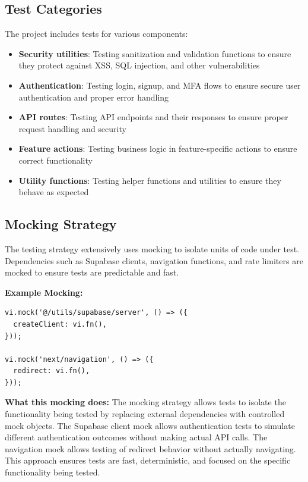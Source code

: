 \subsection{Test Categories}

The project includes tests for various components:

\begin{itemize}
    \item \textbf{Security utilities}: Testing sanitization and validation functions to ensure they protect against XSS, SQL injection, and other vulnerabilities
    \item \textbf{Authentication}: Testing login, signup, and MFA flows to ensure secure user authentication and proper error handling
    \item \textbf{API routes}: Testing API endpoints and their responses to ensure proper request handling and security
    \item \textbf{Feature actions}: Testing business logic in feature-specific actions to ensure correct functionality
    \item \textbf{Utility functions}: Testing helper functions and utilities to ensure they behave as expected
\end{itemize}

\subsection{Mocking Strategy}

The testing strategy extensively uses mocking to isolate units of code under test. Dependencies such as Supabase clients, navigation functions, and rate limiters are mocked to ensure tests are predictable and fast.

\textbf{Example Mocking:}
\begin{verbatim}
vi.mock('@/utils/supabase/server', () => ({
  createClient: vi.fn(),
}));

vi.mock('next/navigation', () => ({
  redirect: vi.fn(),
}));
\end{verbatim}

\textbf{What this mocking does:} The mocking strategy allows tests to isolate the functionality being tested by replacing external dependencies with controlled mock objects. The Supabase client mock allows authentication tests to simulate different authentication outcomes without making actual API calls. The navigation mock allows testing of redirect behavior without actually navigating. This approach ensures tests are fast, deterministic, and focused on the specific functionality being tested.

